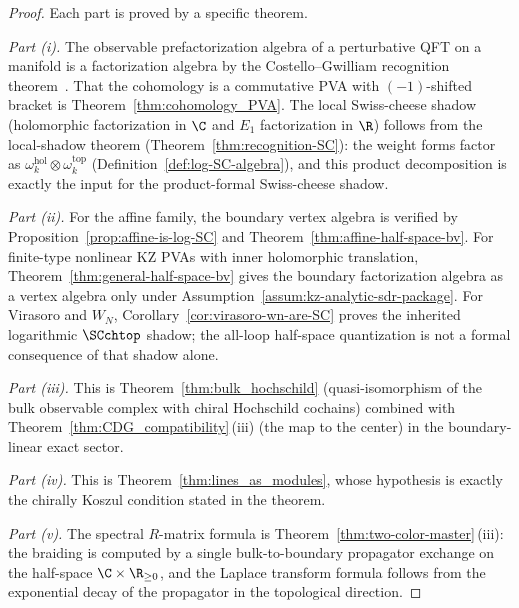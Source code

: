 \begin{proof}
Each part is proved by a specific theorem.

\emph{Part (i).}
The observable prefactorization algebra of a perturbative QFT on a
manifold is a factorization algebra by the Costello--Gwilliam
recognition theorem~\cite{CG17, CG21}. That the cohomology is a
commutative PVA with $(-1)$-shifted bracket is
Theorem~\ref{thm:cohomology_PVA}. The local Swiss-cheese shadow
(holomorphic factorization in $\C$ and $E_1$ factorization in $\R$)
follows from the local-shadow theorem
(Theorem~\ref{thm:recognition-SC}): the weight forms factor as
$\omega_k^{\mathrm{hol}} \otimes \omega_k^{\mathrm{top}}$
(Definition~\ref{def:log-SC-algebra}), and this product decomposition
is exactly the input for the product-formal Swiss-cheese shadow.

\emph{Part (ii).}
For the affine family, the boundary vertex algebra is verified by
Proposition~\ref{prop:affine-is-log-SC} and
Theorem~\ref{thm:affine-half-space-bv}. For finite-type nonlinear KZ
PVAs with inner holomorphic translation,
Theorem~\ref{thm:general-half-space-bv} gives the boundary
factorization algebra as a vertex algebra only under
Assumption~\ref{assum:kz-analytic-sdr-package}. For Virasoro and
$W_N$, Corollary~\ref{cor:virasoro-wn-are-SC} proves the inherited
logarithmic $\SCchtop$ shadow; the all-loop half-space quantization is
not a formal consequence of that shadow alone.

\emph{Part (iii).}
This is Theorem~\ref{thm:bulk_hochschild} (quasi-isomorphism of the
bulk observable complex with chiral Hochschild cochains) combined with
Theorem~\ref{thm:CDG_compatibility}\,(iii) (the map to the center) in
the boundary-linear exact sector.

\emph{Part (iv).}
This is Theorem~\ref{thm:lines_as_modules}, whose hypothesis is exactly
the chirally Koszul condition stated in the theorem.

\emph{Part (v).}
The spectral $R$-matrix formula is
Theorem~\ref{thm:two-color-master}\,(iii): the braiding is computed by
a single bulk-to-boundary propagator exchange on the half-space
$\C \times \R_{\ge 0}$, and the Laplace transform formula follows from
the exponential decay of the propagator in the topological direction.
\end{proof}


